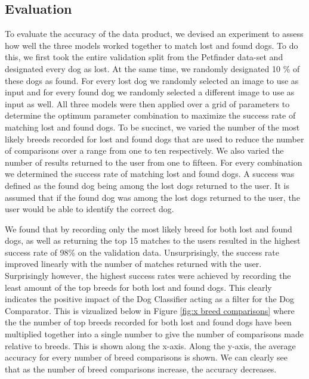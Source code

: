 \documentclass{article}
\begin{document}
\begin{enumerate}
\section{Evaluation}
To evaluate the accuracy of the data product, we devised an experiment to assess how well the three models worked together to match lost and found dogs.  To do this, we first took the entire validation split from the Petfinder data-set and designated every dog as lost.  At the same time, we randomly designated 10 \% of these dogs as found.  For every lost dog we randomly selected an image to use as input and for every found dog we randomly selected a different image to use as input as well.   All three models were then applied over a grid of parameters to determine the optimum parameter combination to maximize the success rate of matching lost and found dogs.  To be succinct, we varied the number of the most likely breeds recorded for lost and found dogs that are used to reduce the number of comparisons over a range from one to ten respectively.  We also varied the number of results returned to the user from one to fifteen.  For every combination we determined the success rate of matching lost and found dogs.  A success was defined as the found dog being among the lost dogs returned to the user.  It is assumed that if the found dog was among the lost dogs returned to the user, the user would be able to identify the correct dog.  

We found that by recording only the most likely breed for both lost and found dogs, as well as returning the top 15 matches to the users resulted in the highest success rate of 98\% on the validation data.  Unsurprisingly, the success rate improved linearly with the number of matches returned with the user.  Surprisingly however, the highest success rates were achieved by recording the least amount of the top breeds for both lost and found dogs.  This clearly indicates the positive impact of the Dog Classifier acting as a filter for the Dog Comparator.  This is vizualized below in Figure \ref{fig:x breed comparisons} where the the number of top breeds recorded for both lost and found dogs have been multiplied together into a single number to give the number of comparisons made relative to breeds.  This is shown along the x-axis.  Along the y-axis, the average accuracy for every number of breed comparisons is shown.  We can clearly see that as the number of breed comparisons increase, the accuracy decreases.


\end{enumerate}
\end{document}
